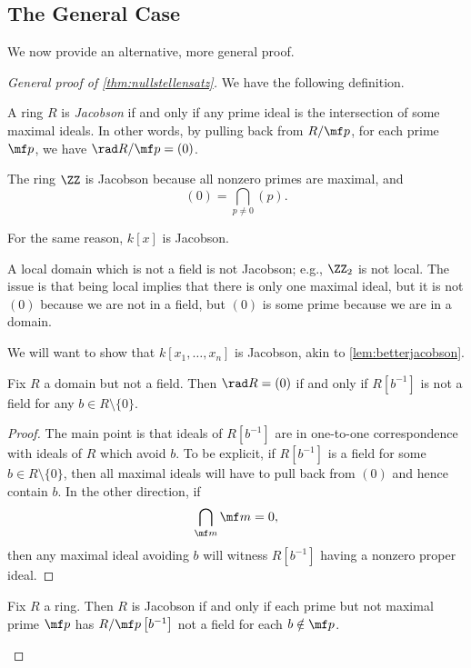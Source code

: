 \subsection{The General Case}
We now provide an alternative, more general proof.
\begin{proof}[General proof of \autoref{thm:nullstellensatz}]
	We have the following definition.
	\begin{definition}[Jacobson]
		A ring $R$ is \textit{Jacobson} if and only if any prime ideal is the intersection of some maximal ideals. In other words, by pulling back from $R/\mf p$, for each prime $\mf p$, we have $\rad R/\mf p=(0)$.
	\end{definition}
	\begin{example}
		The ring $\ZZ$ is Jacobson because all nonzero primes are maximal, and
		\[(0)=\bigcap_{p\ne0}(p).\]
	\end{example}
	\begin{example}
		For the same reason, $k[x]$ is Jacobson.
	\end{example}
	\begin{nex}
		A local domain which is not a field is not Jacobson; e.g., $\ZZ_2$ is not local. The issue is that being local implies that there is only one maximal ideal, but it is not $(0)$ because we are not in a field, but $(0)$ is some prime because we are in a domain.
	\end{nex}
	We will want to show that $k[x_1,\ldots,x_n]$ is Jacobson, akin to \autoref{lem:betterjacobson}.
	\begin{lemma}
		Fix $R$ a domain but not a field. Then $\rad R=(0)$ if and only if $R\left[b^{-1}\right]$ is not a field for any $b\in R\setminus\{0\}$.
	\end{lemma}
	\begin{proof}
		The main point is that ideals of $R\left[b^{-1}\right]$ are in one-to-one correspondence with ideals of $R$ which avoid $b$. To be explicit, if $R\left[b^{-1}\right]$ is a field for some $b\in R\setminus\{0\}$, then all maximal ideals will have to pull back from $(0)$ and hence contain $b$. In the other direction, if
		\[\bigcap_{\mf m}\mf m=0,\]
		then any maximal ideal avoiding $b$ will witness $R\left[b^{-1}\right]$ having a nonzero proper ideal.
	\end{proof}
	\begin{corollary} \label{cor:betterjacobson}
		Fix $R$ a ring. Then $R$ is Jacobson if and only if each prime but not maximal prime $\mf p$ has $R/\mf p\left[b^{-1}\right]$ not a field for each $b\notin\mf p$.

\end{corollary}
\end{proof}
